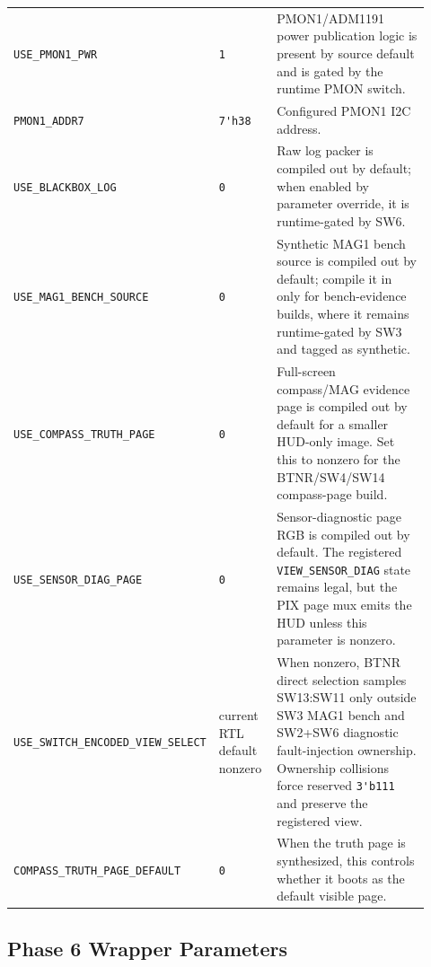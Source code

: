 \documentclass{article}
\newcommand{\sig}[1]{\begingroup\nolinkurl{#1}\endgroup}
\newcommand{\param}[1]{\begingroup\nolinkurl{#1}\endgroup}
\begin{document}
\begin{longtable}{p{0.27\linewidth} p{0.15\linewidth} p{0.50\linewidth}}
\param{USE_PMON1_PWR} & \sig{1} &
PMON1/ADM1191 power publication logic is present by source default and is gated
by the runtime PMON switch. \\
\param{PMON1_ADDR7} & \sig{7'h38} &
Configured PMON1 I2C address. \\
\param{USE_BLACKBOX_LOG} & \sig{0} &
Raw log packer is compiled out by default; when enabled by parameter override,
it is runtime-gated by SW6. \\
\param{USE_MAG1_BENCH_SOURCE} & \sig{0} &
Synthetic MAG1 bench source is compiled out by default; compile it in only for
bench-evidence builds, where it remains runtime-gated by SW3 and tagged as
synthetic. \\
\param{USE_COMPASS_TRUTH_PAGE} & \sig{0} &
Full-screen compass/MAG evidence page is compiled out by default for a smaller
HUD-only image.  Set this to nonzero for the BTNR/SW4/SW14 compass-page build. \\
\param{USE_SENSOR_DIAG_PAGE} & \sig{0} &
Sensor-diagnostic page RGB is compiled out by default.  The registered
\sig{VIEW_SENSOR_DIAG} state remains legal, but the PIX page mux emits the HUD
unless this parameter is nonzero. \\
\param{USE_SWITCH_ENCODED_VIEW_SELECT} & current RTL default nonzero &
When nonzero, BTNR direct selection samples SW13:SW11 only outside SW3 MAG1
bench and SW2+SW6 diagnostic fault-injection ownership.  Ownership collisions
force reserved \sig{3'b111} and preserve the registered view. \\
\param{COMPASS_TRUTH_PAGE_DEFAULT} & \sig{0} &
When the truth page is synthesized, this controls whether it boots as the
default visible page. \\
\bottomrule
\end{longtable}

\subsection{Phase 6 Wrapper Parameters}
\end{document}
